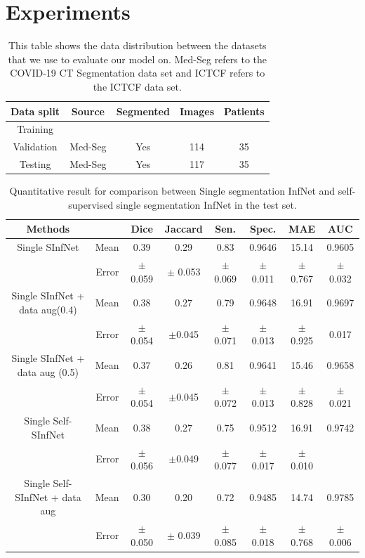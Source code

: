 \section{Experiments}

\begin{table}[!h]
	\centering
	\begin{tabular}{|c||c|c|c|c|} \hline
		Data split & Source & Segmented & Images & Patients \\\hline
		Training & \vtop{\hbox{\strut Med-Seg}\hbox{\strut ICTCF}}&
		\vtop{\hbox{\strut Yes}\hbox{\strut No}} & 
		\vtop{\hbox{\strut 698}\hbox{\strut 6654}}&
		\vtop{\hbox{\strut 39}\hbox{\strut 1338}}\\\hline
		Validation & Med-Seg & Yes & 114 & 35 \\\hline
		Testing & Med-Seg & Yes & 117 & 35 \\\hline
	\end{tabular}
	\caption{This table shows the data distribution between the datasets that we use to evaluate our model on. Med-Seg refers to the COVID-19 CT Segmentation data set and ICTCF refers to the ICTCF data set.}
	\label{tab:dataset}
\end{table}

\begin{table}[!h]
	\centering
	\begin{tabular}{| c | c || c c c c c | c ||}
		\hline
		Methods & & Dice & Jaccard & Sen. & Spec. & MAE & AUC \\ \hline
		Single SInfNet &  Mean & 0.39 &0.29 & 0.83 & 0.9646 & 15.14 & 0.9605 \\ \cline{2-8}
		& Error & $\pm$ 0.059 & $\pm$ 0.053 & $\pm$0.069 & $\pm$ 0.011 & $\pm$ 0.767 & $\pm$0.032 \\ \hline
		Single SInfNet + data aug(0.4) &  Mean & 0.38 & 0.27 & 0.79 & 0.9648 & 16.91 & 0.9697 \\ \cline{2-8}
		& Error & $\pm$0.054  & $\pm$0.045  &$\pm$0.071 &$\pm$0.013 &$\pm$0.925 & 0.017 \\ \hline
		Single SInfNet + data aug (0.5) &  Mean & 0.37 & 0.26 & 0.81 & 0.9641 & 15.46 & 0.9658 \\ \cline{2-8}
		& Error &$\pm$0.054 &$\pm$0.045 &$\pm$0.072 &$\pm$0.013 & $\pm$0.828 & $\pm$0.021  \\ \hline \hline
		Single Self-SInfNet &  Mean & 0.38 & 0.27 & 0.75 & 0.9512 & 16.91 & 0.9742  \\ \cline{2-8}
		& Error & $\pm$0.056 & $\pm$0.049 &$\pm$0.077  & $\pm$0.017 & $\pm$ 0.010 & \\ \hline
		Single Self-SInfNet + data aug &  Mean & 0.30 & 0.20 & 0.72 & 0.9485 & 14.74 & 0.9785 \\ \cline{2-8}
		& Error & $\pm$ 0.050  & $\pm$ 0.039 & $\pm$ 0.085 & $\pm$0.018 & $\pm$0.768 & $\pm$0.006  \\ \hline
	\end{tabular}
	\caption{Quantitative result for comparison between Single segmentation InfNet and self-supervised single segmentation InfNet in the test set.}
	\label{tab:single}
\end{table}

